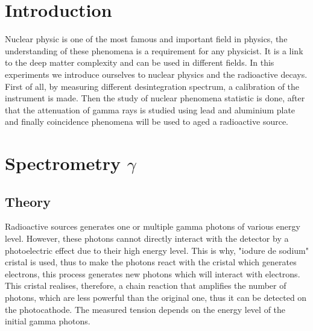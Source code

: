 \documentclass[a4paper,12pt,oneside]{article}
\begin{document}
\title{}
\author{Laurent Rohrbasser \& Tim Tuuva}

\maketitle
\tableofcontents
\baselineskip=16pt
\parindent=15pt
\parskip=5pt

\begin{abstract}
\end{abstract}

\section{Introduction}
Nuclear physic is one of the most famous and important field in physics, the understanding of these phenomena is a requirement for any physicist. It is a link to the deep matter complexity and can be used in different fields. In this experiments we introduce ourselves to nuclear physics and the radioactive decays. First of all, by measuring different desintegration spectrum, a calibration of the instrument is made. Then the study of nuclear phenomena statistic is done, after that the attenuation of gamma rays is studied using lead and aluminium plate and finally coincidence phenomena will be used to aged a radioactive source.

\section{Spectrometry $\gamma$}
\subsection{Theory}
Radioactive sources generates one or multiple gamma photons of various 
energy level. However, these photons cannot directly interact with the
 detector by a photoelectric effect due to their high energy level. 
This is why, "iodure de sodium" cristal is used, thus to make the 
photons react with the cristal which generates electrons, this 
process generates new photons which will interact with electrons. 
This cristal realises, therefore, a chain reaction that amplifies the 
number of photons, which are less powerful than the original one, 
thus it can be detected on the photocathode. The measured tension 
depends on the energy level of the initial gamma photons.
\end{document}
